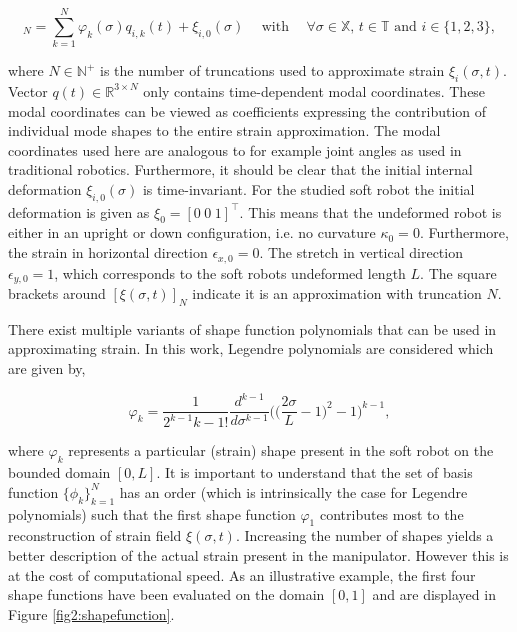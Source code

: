 \begin{equation}
    [\xi_i(\sigma,t)]_N = \sum_{k=1}^N \varphi_k(\sigma)q_{i,k}(t) + \xi_{i,0}(\sigma) \hspace{15pt} \text{with} \hspace{15pt} \forall \sigma \in \mathbb{X}, \hspace{2pt} t \in \mathbb{T}  \hspace{4pt} \text{and} \hspace{4pt} i \in \{1,2,3\},
    \label{eq2:strainapprox}
\end{equation}

where $N \in \mathbb{N}^+$ is the number of truncations used to approximate strain $\xi_i(\sigma,t)$. Vector $q(t) \in \mathbb{R}^{3 \times N}$ only contains time-dependent modal coordinates. These modal coordinates can be viewed as coefficients expressing the contribution of individual mode shapes to the entire strain approximation. The modal coordinates used here are analogous to for example joint angles as used in traditional robotics. Furthermore, it should be clear that the initial internal deformation $\xi_{i,0}(\sigma)$ is time-invariant. For the studied soft robot the initial deformation is given as $\xi_0 = [0 \hspace{3pt} 0 \hspace{3pt} 1]^\top$. This means that the undeformed robot is either in an upright or down configuration, i.e. no curvature $\kappa_0 = 0$. Furthermore, the strain in horizontal direction $\epsilon_{x,0} = 0$. The stretch in vertical direction $\epsilon_{y,0} = 1$, which corresponds to the soft robots undeformed length $L$. The square brackets around $[\xi(\sigma,t)]_N$ indicate it is an approximation with truncation $N$. 

There exist multiple variants of shape function polynomials that can be used in approximating strain. In this work, Legendre polynomials are considered which are given by,

\begin{equation}
    \varphi_{k} = \frac{1}{2^{k-1} k-1!} \frac{d^{k-1}}{d\sigma^{k-1}}\Big(\Big(\frac{2\sigma}{L}-1\Big)^2-1\Big)^{k-1},
    \label{eq2:shapefunction}
\end{equation}

where $\varphi_k$ represents a particular (strain) shape present in the soft robot on the bounded domain $[0,L]$. It is important to understand that the set of basis function $\{\phi_k\}_{k=1}^N$ has an order (which is intrinsically the case for Legendre polynomials) such that the first shape function $\varphi_1$ contributes most to the reconstruction of strain field $\xi(\sigma,t)$. Increasing the number of shapes yields a better description of the actual strain present in the manipulator. However this is at the cost of computational speed. As an illustrative example, the first four shape functions have been evaluated on the domain $[0,1]$ and are displayed in Figure \ref{fig2:shapefunction}.

